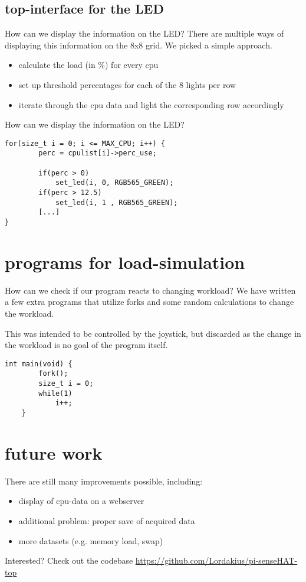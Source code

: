 \documentclass{beamer}
\begin{document}
\subsection{top-interface for the LED}
\begin{frame}{How can we display the information on the LED?}
There are multiple ways of displaying this information on the 8x8 grid. We
picked a simple approach.
  \begin{itemize}
		\item calculate the load (in \%) for every cpu
		\item set up threshold percentages for each of the 8 lights per row
		\item iterate through the cpu data and light the corresponding row
			accordingly
  \end{itemize}
\end{frame}

\begin{frame}[fragile]{How can we display the information on the LED?}
	\begin{lstlisting}[tabsize=2]
for(size_t i = 0; i <= MAX_CPU; i++) {
		perc = cpulist[i]->perc_use;

		if(perc > 0)
			set_led(i, 0, RGB565_GREEN);
		if(perc > 12.5)
			set_led(i, 1 , RGB565_GREEN);
		[...]
}
	\end{lstlisting}
\end{frame}
\section{programs for load-simulation}
\begin{frame}[fragile]{How can we check if our program reacts to changing workload?}
	We have written a few extra programs that utilize forks and some random
	calculations to change the workload. 

	This was intended to be controlled by the joystick, but discarded as the 
	change in the workload is no goal of the program itself.
	\begin{lstlisting}[tabsize=2]
	int main(void) {
		fork();
		size_t i = 0;
		while(1)
			i++;
	}
	\end{lstlisting}
\end{frame}
\section{future work}
\begin{frame}{There are still many improvements possible, including:}
\begin{itemize}
	\item display of cpu-data on a webserver
	\item additional problem: proper save of acquired data
	\item more datasets (e.g. memory load, swap)
\end{itemize}
\end{frame}
\begin{frame}{Interested? Check out the codebase}
	\url{https://github.com/Lordakius/pi-senseHAT-top}
\end{frame}
\end{document}
